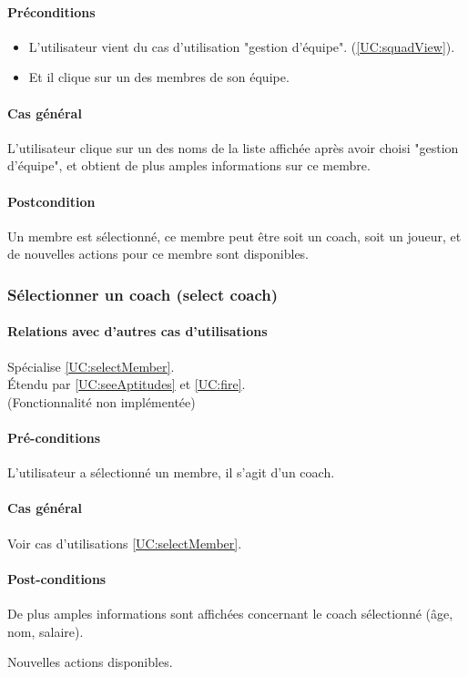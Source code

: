 \paragraph{Préconditions}
\begin{itemize}
	\item L'utilisateur vient du cas d'utilisation "gestion d'équipe".
		  (\ref{UC:squadView}).
	\item Et il clique sur un des membres de son équipe.
\end{itemize}
\paragraph{Cas général}
L'utilisateur clique sur un des noms de la liste affichée après avoir choisi "gestion d'équipe", et obtient de plus amples informations sur ce membre. 
\paragraph{Postcondition}
Un membre est sélectionné, ce membre peut être soit un coach, soit un joueur, 
et de nouvelles actions pour ce membre sont disponibles.

\subsubsection{Sélectionner un coach (select coach)} 
\label{UC:selectCoach}
\paragraph{Relations avec d'autres cas d'utilisations}
Spécialise \ref{UC:selectMember}.\\
Étendu par \ref{UC:seeAptitudes} et \ref{UC:fire}.\\
(Fonctionnalité non implémentée)
\paragraph{Pré-conditions}
\begin{list}{}{\leftmargin=1.5em}
\item{L'utilisateur a sélectionné un membre, il s'agit d'un coach.}
\end{list}
\paragraph{Cas général}
Voir cas d'utilisations \ref{UC:selectMember}.
\paragraph{Post-conditions}
\begin{list}{}{\leftmargin=1.5em}
\item{De plus amples informations sont affichées concernant le coach sélectionné (âge, nom, salaire).}
\item{Nouvelles actions disponibles.}
\end{list}


